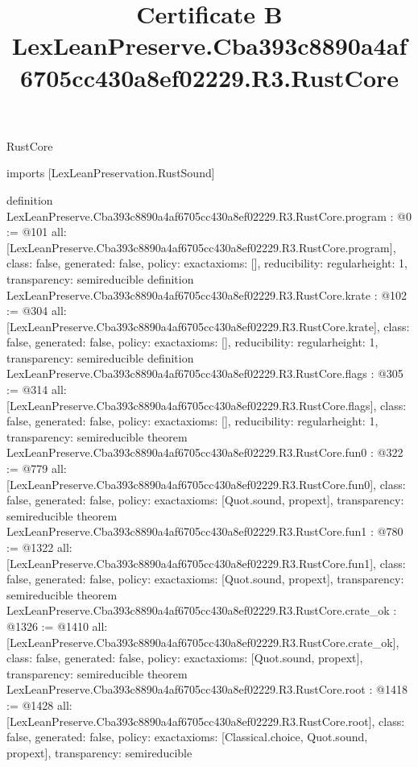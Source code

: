 \begin{lexlean}{RustCore}
\title{Certificate B LexLeanPreserve.Cba393c8890a4af6705cc430a8ef02229.R3.RustCore}
\begin{coremodule}
imports [LexLeanPreservation.RustSound]

definition LexLeanPreserve.Cba393c8890a4af6705cc430a8ef02229.R3.RustCore.program : @0 := @101 {
  all: [LexLeanPreserve.Cba393c8890a4af6705cc430a8ef02229.R3.RustCore.program],
  class: false,
  generated: false,
  policy: exact{axioms: []},
  reducibility: regular{height: 1},
  transparency: semireducible
}
definition LexLeanPreserve.Cba393c8890a4af6705cc430a8ef02229.R3.RustCore.krate : @102 := @304 {
  all: [LexLeanPreserve.Cba393c8890a4af6705cc430a8ef02229.R3.RustCore.krate],
  class: false,
  generated: false,
  policy: exact{axioms: []},
  reducibility: regular{height: 1},
  transparency: semireducible
}
definition LexLeanPreserve.Cba393c8890a4af6705cc430a8ef02229.R3.RustCore.flags : @305 := @314 {
  all: [LexLeanPreserve.Cba393c8890a4af6705cc430a8ef02229.R3.RustCore.flags],
  class: false,
  generated: false,
  policy: exact{axioms: []},
  reducibility: regular{height: 1},
  transparency: semireducible
}
theorem LexLeanPreserve.Cba393c8890a4af6705cc430a8ef02229.R3.RustCore.fun0 : @322 := @779 {
  all: [LexLeanPreserve.Cba393c8890a4af6705cc430a8ef02229.R3.RustCore.fun0],
  class: false,
  generated: false,
  policy: exact{axioms: [Quot.sound, propext]},
  transparency: semireducible
}
theorem LexLeanPreserve.Cba393c8890a4af6705cc430a8ef02229.R3.RustCore.fun1 : @780 := @1322 {
  all: [LexLeanPreserve.Cba393c8890a4af6705cc430a8ef02229.R3.RustCore.fun1],
  class: false,
  generated: false,
  policy: exact{axioms: [Quot.sound, propext]},
  transparency: semireducible
}
theorem LexLeanPreserve.Cba393c8890a4af6705cc430a8ef02229.R3.RustCore.crate_ok : @1326 := @1410 {
  all: [LexLeanPreserve.Cba393c8890a4af6705cc430a8ef02229.R3.RustCore.crate_ok],
  class: false,
  generated: false,
  policy: exact{axioms: [Quot.sound, propext]},
  transparency: semireducible
}
theorem LexLeanPreserve.Cba393c8890a4af6705cc430a8ef02229.R3.RustCore.root : @1418 := @1428 {
  all: [LexLeanPreserve.Cba393c8890a4af6705cc430a8ef02229.R3.RustCore.root],
  class: false,
  generated: false,
  policy: exact{axioms: [Classical.choice, Quot.sound, propext]},
  transparency: semireducible
}


\end{coremodule}
\end{lexlean}
